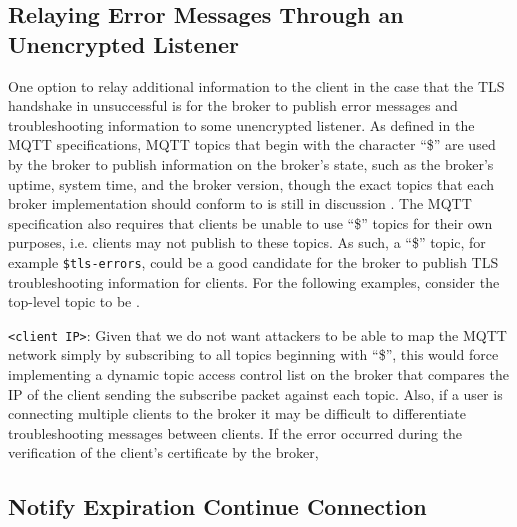 \documentclass[12pt]{article}
\begin{document}
\subsection{Relaying Error Messages Through an Unencrypted Listener}
One option to relay additional information to the client in the case that the TLS handshake in unsuccessful is for the broker to publish error messages and troubleshooting information to some unencrypted listener. As defined in the MQTT specifications, MQTT topics that begin with the character ``\$'' are used by the broker to publish information on the broker's state, such as the broker's uptime, system time, and the broker version, though the exact topics that each broker implementation should conform to is still in discussion \cite{mqtt-sys}. The MQTT specification also requires that clients be unable to use ``\$'' topics for their own purposes, i.e. clients may not publish to these topics. As such, a ``\$'' topic, for example \texttt{\$tls-errors}, could be a good candidate for the broker to publish TLS troubleshooting information for clients. For the following examples, consider the top-level topic to be .\par
 \texttt{<client IP>}: Given that we do not want attackers to be able to map the MQTT network simply by subscribing to all topics beginning with ``\$'', this would force implementing a dynamic topic access control list on the broker that compares the IP of the client sending the subscribe packet against each topic. Also, if a user is connecting multiple clients to the broker it may be difficult to differentiate troubleshooting messages between clients.
 If the error occurred during the verification of the client's certificate by the broker, 
\subsection{Notify Expiration Continue Connection}
\end{document}
